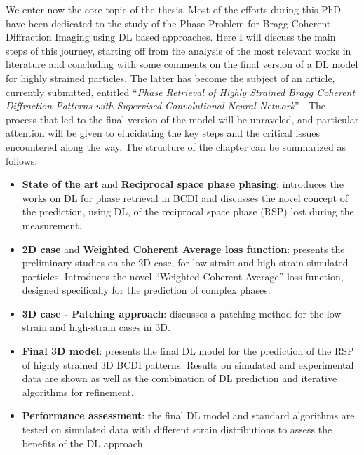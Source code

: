 

We enter now the core topic of the thesis. Most of the efforts during this PhD have been dedicated to the study of the Phase Problem 
for Bragg Coherent Diffraction Imaging using DL based approaches. Here I will discuss the main steps of this
journey, starting off from the analysis of the most relevant works in literature and concluding with some comments on the final version
of a DL model for highly strained particles. The latter has become the subject of an article, currently submitted, 
entitled ``\textit{Phase Retrieval of Highly Strained Bragg Coherent Diffraction Patterns with Supervised Convolutional 
Neural Network}'' \cite{Masto2025}. The process that led to the final version of the model will be unraveled, and particular attention
 will be given to elucidating the key steps and the critical issues encountered along the way. 
The structure of the chapter can be summarized as follows: 

\begin{itemize}
    \item \textbf{State of the art} and \textbf{Reciprocal space phase phasing}: introduces the works on DL for phase 
    retrieval in BCDI and discusses the novel concept of the prediction, using DL, of the reciprocal space phase (RSP) 
    lost during the measurement. 

    \item \textbf{2D case} and \textbf{Weighted Coherent Average loss function}: presents the preliminary studies on 
    the 2D case, for low-strain and high-strain simulated particles. Introduces the novel ``Weighted Coherent Average'' loss function, 
    designed specifically for the prediction of complex phases.

    \item \textbf{3D case - Patching approach}: discusses a patching-method for the low-strain and high-strain cases in 
    3D. 
    
    \item \textbf{Final 3D model}: presents the final DL model for the prediction of the RSP of highly strained 3D BCDI 
    patterns. Results on simulated and experimental data are shown as well as the combination of DL prediction and 
    iterative algorithms for refinement. 

    \item \textbf{Performance assessment}: the final DL model and standard algorithms are tested on simulated data with 
    different strain distributions to assess the benefits of the DL approach. 

\end{itemize}

